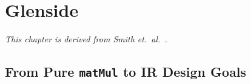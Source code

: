 





\chapter{Glenside}
\label{sec:part1-glenside}

\textit{This chapter is derived from Smith et.~al.~\cite{smith2021pure}.}



\section{From Pure \texttt{matMul} to IR Design Goals}
\label{sec:matmul}

  
